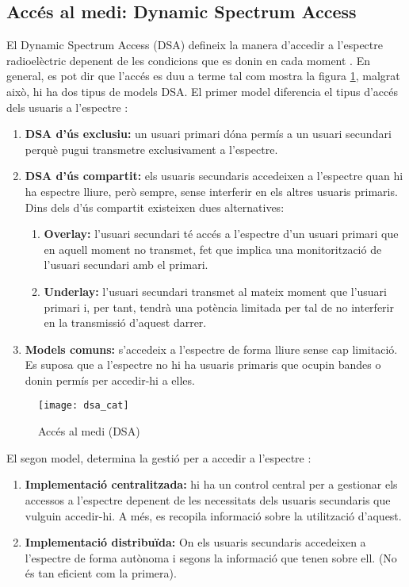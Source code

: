\documentclass[10pt,journal,a4paper]{IEEEtran}
\begin{document}
\subsection{Accés al medi: Dynamic Spectrum Access}
El Dynamic Spectrum Access (DSA) defineix la manera d'accedir a l'espectre radioelèctric depenent de les condicions que es donin en cada moment . En general, es pot dir que l'accés es duu a terme tal com mostra la figura \ref{dsa}, malgrat això, hi ha dos tipus de models DSA. 
El primer model diferencia el tipus d'accés dels usuaris a l'espectre \cite{garwhal_2011}:
\begin{enumerate}
\item \textbf{DSA d'ús exclusiu:} un usuari primari dóna permís a un usuari secundari perquè pugui transmetre exclusivament a l'espectre.
\item \textbf{DSA d'ús compartit:} els usuaris secundaris accedeixen a l'espectre quan hi ha espectre lliure, però sempre, sense interferir en els altres usuaris primaris.
Dins dels d'ús compartit existeixen dues alternatives:
\begin{enumerate}
\item \textbf{Overlay:} l'usuari secundari té accés a l'espectre d'un usuari primari que en aquell moment no transmet, fet que implica una monitorització de l'usuari secundari amb el primari.
\item \textbf{Underlay:} l'usuari secundari transmet al mateix moment que l'usuari primari i, per tant, tendrà una potència limitada per tal de no interferir en la transmissió d'aquest darrer. 
\end{enumerate}
\item \textbf{Models comuns:} s'accedeix a l'espectre de forma lliure sense cap limitació. Es suposa que a l'espectre no hi ha usuaris primaris que ocupin bandes o donin permís per accedir-hi a elles.
\end{enumerate}
\begin{figure}
\centering
\texttt{[image: dsa\_cat]}
\caption{Accés al medi (DSA)}
\label{dsa}
\end{figure}
El segon model, determina la gestió per a accedir a l'espectre \cite{garwhal_2011}:
\begin{enumerate}
\item \textbf{Implementació centralitzada:} hi ha un control central per a gestionar els accessos a l'espectre depenent de les necessitats dels usuaris secundaris que vulguin accedir-hi. A més, es recopila informació sobre la utilització d'aquest.
\item \textbf{Implementació distribuïda:} On els usuaris secundaris accedeixen  a l'espectre de forma autònoma i segons la informació que tenen sobre ell. (No és tan eficient com la primera).
\end{enumerate}
\end{document}
